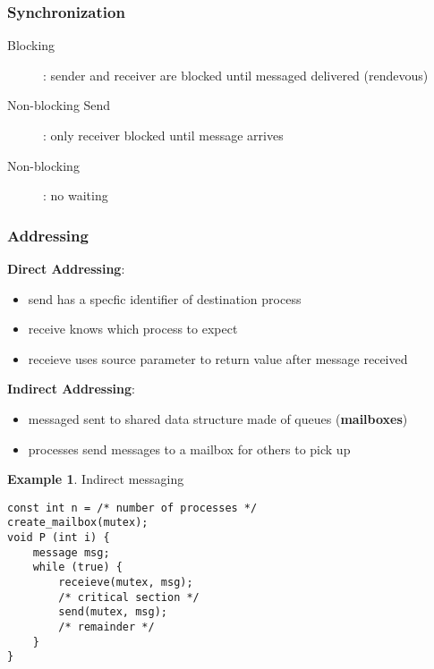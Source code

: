 \documentclass[]{article}
\theoremstyle{definition}
\newtheorem{ex}{Example}[section]
\begin{document}
				\subsubsection{Synchronization}
					\begin{description}
						\item[Blocking]: sender and receiver are blocked until messaged delivered (rendevous)
						\item[Non-blocking Send]: only receiver blocked until message arrives
						\item[Non-blocking]: no waiting
					\end{description}
				\subsubsection{Addressing}
				\textbf{Direct Addressing}:
				\begin{itemize}
					\item send has a specfic identifier of destination process
					\item receive knows which process to expect
					\item receieve uses source parameter to return value after message received
				\end{itemize}
				\textbf{Indirect Addressing}:
				\begin{itemize}
					\item messaged sent to shared data structure made of queues (\textbf{mailboxes})
					\item processes send messages to a mailbox for others to pick up
				\end{itemize}
				\begin{ex}
					Indirect messaging
					\begin{lstlisting}
const int n = /* number of processes */
create_mailbox(mutex);
void P (int i) {
	message msg;
	while (true) {
		receieve(mutex, msg);
		/* critical section */
		send(mutex, msg);
		/* remainder */
	}
}
					\end{lstlisting}
				\end{ex}
\end{document}
